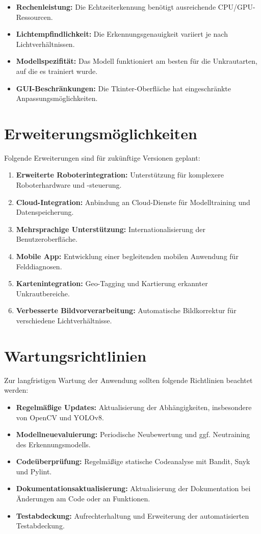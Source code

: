 \documentclass[12pt, a4paper]{scrreprt}
\begin{document}
\begin{itemize}
    \item \textbf{Rechenleistung:} Die Echtzeiterkennung benötigt ausreichende CPU/GPU-Ressourcen.
    \item \textbf{Lichtempfindlichkeit:} Die Erkennungsgenauigkeit variiert je nach Lichtverhältnissen.
    \item \textbf{Modellspezifität:} Das Modell funktioniert am besten für die Unkrautarten, auf die es trainiert wurde.
    \item \textbf{GUI-Beschränkungen:} Die Tkinter-Oberfläche hat eingeschränkte Anpassungsmöglichkeiten.
\end{itemize}

\section{Erweiterungsmöglichkeiten}
Folgende Erweiterungen sind für zukünftige Versionen geplant:

\begin{enumerate}
    \item \textbf{Erweiterte Roboterintegration:} Unterstützung für komplexere Roboterhardware und -steuerung.
    \item \textbf{Cloud-Integration:} Anbindung an Cloud-Dienste für Modelltraining und Datenspeicherung.
    \item \textbf{Mehrsprachige Unterstützung:} Internationalisierung der Benutzeroberfläche.
    \item \textbf{Mobile App:} Entwicklung einer begleitenden mobilen Anwendung für Felddiagnosen.
    \item \textbf{Kartenintegration:} Geo-Tagging und Kartierung erkannter Unkrautbereiche.
    \item \textbf{Verbesserte Bildvorverarbeitung:} Automatische Bildkorrektur für verschiedene Lichtverhältnisse.
\end{enumerate}

\section{Wartungsrichtlinien}
Zur langfristigen Wartung der Anwendung sollten folgende Richtlinien beachtet werden:

\begin{itemize}
    \item \textbf{Regelmäßige Updates:} Aktualisierung der Abhängigkeiten, insbesondere von OpenCV und YOLOv8.
    \item \textbf{Modellneuevaluierung:} Periodische Neubewertung und ggf. Neutraining des Erkennungsmodells.
    \item \textbf{Codeüberprüfung:} Regelmäßige statische Codeanalyse mit Bandit, Snyk und Pylint.
    \item \textbf{Dokumentationsaktualisierung:} Aktualisierung der Dokumentation bei Änderungen am Code oder an Funktionen.
    \item \textbf{Testabdeckung:} Aufrechterhaltung und Erweiterung der automatisierten Testabdeckung.
\end{itemize}
\end{document}
